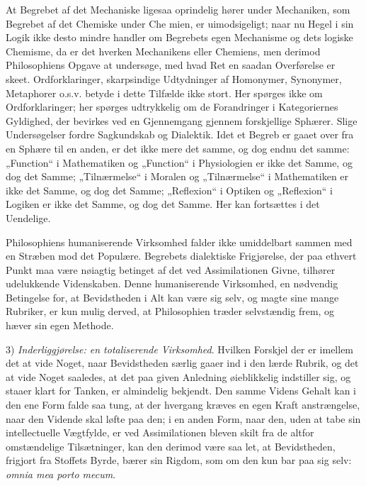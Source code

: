 \documentclass[12pt]{book}
\newcommand{\opage}[1]{\marginnote{\footnotesize\textit{[#1]}}}
\begin{document}
At Begrebet af det Mechaniske ligesaa oprindelig hører under Mechaniken, som Begrebet af det
Chemiske under Che%
\opage{114}mien, er uimodsigeligt; naar nu Hegel i sin Logik ikke desto mindre handler om Begrebets
egen Mechanisme og dets logiske Chemisme, da er det hverken Mechanikens eller Chemiens, men
derimod Philosophiens Opgave at undersøge, med hvad Ret en saadan Overførelse er skeet.
Ordforklaringer, skarpsindige Udtydninger af Homonymer, Synonymer, Metaphorer o.s.v. betyde
i dette Tilfælde ikke stort. Her spørges ikke om Ordforklaringer; her spørges udtrykkelig om
de Forandringer i Kategoriernes Gyldighed, der bevirkes ved en Gjennemgang gjennem
forskjellige Sphærer. Slige Undersøgelser fordre Sagkundskab og Dialektik. Idet et Begreb er
gaaet over fra en Sphære til en anden, er det ikke mere det samme, og dog endnu det samme:
„Function“ i Mathematiken og „Function“ i Physiologien er ikke det Samme, og dog det Samme;
„Tilnærmelse“ i Moralen og „Tilnærmelse“ i Mathematiken er ikke det Samme, og dog det Samme;
„Reflexion“ i Optiken og „Reflexion“ i Logiken er ikke det Samme, og dog det Samme. Her kan
fortsættes i det Uendelige.

Philosophiens humaniserende Virksomhed falder ikke umiddelbart sammen med en Stræben mod det
Populære. Begrebets dialektiske Frigjørelse, der paa ethvert Punkt maa være nøiagtig
betinget af det ved Assimilationen Givne, tilhører udelukkende Videnskaben. Denne
humaniserende Virksomhed, en nødvendig Betingelse for, at Bevidstheden i Alt kan være sig
selv, og magte sine mange Rubriker, er kun mulig derved, at Philosophien træder selvstændig
frem, og hæver sin egen Methode.

3) \emph{Inderliggjørelse: en totaliserende Virksomhed}. Hvilken Forskjel der er imellem det
at vide Noget, naar Bevidstheden særlig gaaer ind i den lærde Rubrik, og det at vide Noget
saaledes, at det paa given Anledning øieblikkelig indstiller sig, og staaer klart for Tanken,
er almindelig bekjendt. Den samme Videns Gehalt kan i den ene Form falde saa tung, at der
hvergang kræves en egen Kraft%
\opage{115}anstrængelse, naar den Vidende skal løfte paa den; i en anden Form, naar den, uden at tabe
sin intellectuelle Vægtfylde, er ved Assimilationen bleven skilt fra de altfor omstændelige
Tilsætninger, kan den derimod være saa let, at Bevidstheden, frigjort fra Stoffets Byrde,
bærer sin Rigdom, som om den kun bar paa sig selv: \textit{omnia mea porto mecum}.
\end{document}
